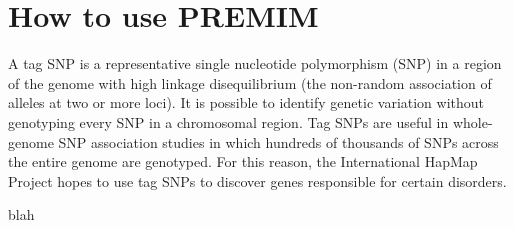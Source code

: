 \section{How to use PREMIM}
\label{usage}

A tag SNP is a representative single nucleotide polymorphism (SNP) in a region of the genome with high linkage disequilibrium (the non-random association of alleles at two or more loci). It is possible to identify genetic variation without genotyping every SNP in a chromosomal region. Tag SNPs are useful in whole-genome SNP association studies in which hundreds of thousands of SNPs across the entire genome are genotyped. For this reason, the International HapMap Project hopes to use tag SNPs to discover genes responsible for certain disorders. 

blah 

